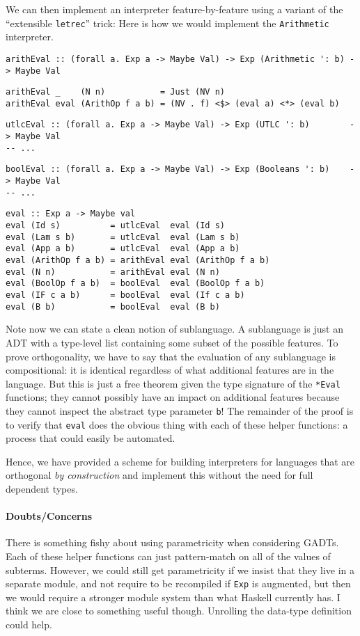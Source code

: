 \documentclass[12pt]{article}
\begin{document}
We can then implement an interpreter feature-by-feature using a variant of the ``extensible
\verb|letrec|'' trick: Here is how we would implement the \texttt{Arithmetic} interpreter.

\begin{verbatim}
arithEval :: (forall a. Exp a -> Maybe Val) -> Exp (Arithmetic ': b) -> Maybe Val
\end{verbatim}
\begin{verbatim}
arithEval _    (N n)           = Just (NV n)
arithEval eval (ArithOp f a b) = (NV . f) <$> (eval a) <*> (eval b)
\end{verbatim}
\begin{verbatim}
utlcEval :: (forall a. Exp a -> Maybe Val) -> Exp (UTLC ': b)        -> Maybe Val
-- ...
\end{verbatim}
\begin{verbatim}
boolEval :: (forall a. Exp a -> Maybe Val) -> Exp (Booleans ': b)    -> Maybe Val
-- ...
\end{verbatim}
\begin{verbatim}
eval :: Exp a -> Maybe val
eval (Id s)          = utlcEval  eval (Id s)
eval (Lam s b)       = utlcEval  eval (Lam s b)
eval (App a b)       = utlcEval  eval (App a b)
eval (ArithOp f a b) = arithEval eval (ArithOp f a b)
eval (N n)           = arithEval eval (N n)
eval (BoolOp f a b)  = boolEval  eval (BoolOp f a b)
eval (IF c a b)      = boolEval  eval (If c a b)
eval (B b)           = boolEval  eval (B b)
\end{verbatim}

Note now we can state a clean notion of sublanguage. A sublanguage is just an
ADT with a type-level list containing some subset of the possible features. To
prove orthogonality, we have to say that the evaluation of any sublanguage is
compositional: it is identical regardless of what additional features are in the
language. But this is just a free theorem given the type signature of the
\texttt{*Eval} functions; they cannot possibly have an impact on additional
features because they cannot inspect the abstract type parameter \texttt{b}! The
remainder of the proof is to verify that \texttt{eval} does the obvious thing
with each of these helper functions: a process that could easily be automated.

Hence, we have provided a scheme for building interpreters for languages that
are orthogonal \emph{by construction} and implement this without the need for
full dependent types.

\paragraph{Doubts/Concerns} There is something fishy about using parametricity when
considering GADTs. Each of these helper functions can just pattern-match on
all of the values of subterms. However, we could still get parametricity if we
insist that they live in a separate module, and not require to be recompiled if
\texttt{Exp} is augmented, but then we would require a stronger module system
than what Haskell currently has. I think we are close to something useful
though. Unrolling the data-type definition could help.
\end{document}
